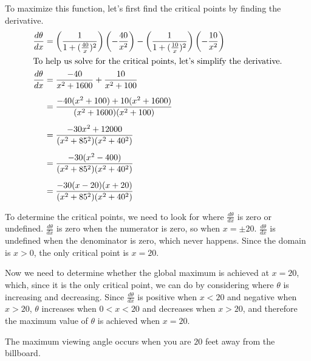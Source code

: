 \documentclass{article}
\begin{document}
\begin{enumerate}
\begin{solution}
To maximize this function, let's first find the critical points
by finding the derivative.
\begin{align*}
    \dfrac{d\theta}{dx} &= \left(\dfrac{1}{1+(\frac{40}{x})^2}\right)
    \left(-\dfrac{40}{x^2}\right) - \left(\dfrac{1}{1+(\frac{10}{x})^2}\right)
    \left(-\dfrac{10}{x^2}\right) \\
    \intertext{To help us solve for the critical points,
    let's simplify the derivative.}
    \dfrac{d\theta}{dx} &= \dfrac{-40}{x^2 + 1600} + \dfrac{10}{x^2 + 100} \\[5pt]
    &= \dfrac{-40(x^2+100)+10(x^2+1600)}{(x^2+1600)(x^2+100)}\\[5pt]
    &= \dfrac{-30x^2+12000}{(x^2+85^2)(x^2+40^2)} \\[5pt]
    &= \dfrac{-30(x^2-400)}{(x^2+85^2)(x^2+40^2)} \\[5pt]
    &= \dfrac{-30(x-20)(x+20)}{(x^2+85^2)(x^2+40^2)}
\end{align*}

To determine the critical points, we need to look for where 
$\frac{d\theta}{dx}$ is zero or undefined. $\frac{d\theta}{dx}$ is zero when the numerator is zero, so when $x=\pm 20$.
$\frac{d\theta}{dx}$ is undefined when the denominator is zero, which never happens. 
Since the domain is $x>0$, the only critical point is $x=20$. 

Now we need to determine whether the global maximum is achieved
at 
$x=20$, which, since it is the only critical point, we can do by considering where $\theta$ is increasing and decreasing. Since $\frac{d\theta}{dx}$
is positive when $x<20$ and negative when $x>20$, $\theta$
increases when $0<x<20$ and decreases when $x>20$, and therefore
the maximum value of $\theta$ is achieved when $x=20$.

The maximum viewing angle occurs when you are $20$ feet away
from the billboard. 


\end{solution}

\end{enumerate}
\end{document}
